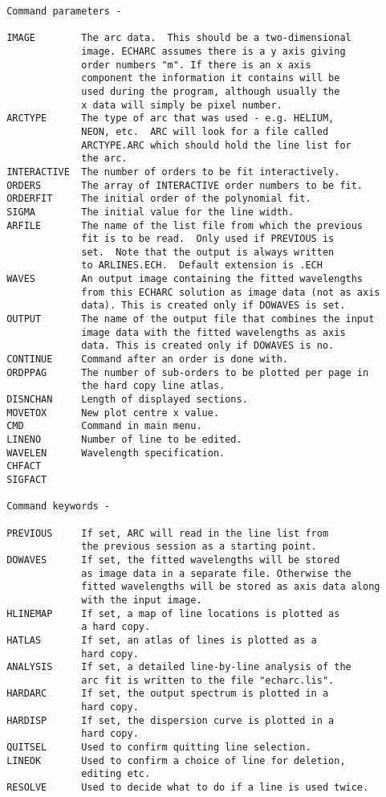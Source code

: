 \begin{description}
\begin{verbatim}
 Command parameters -

 IMAGE        The arc data.  This should be a two-dimensional
              image. ECHARC assumes there is a y axis giving
              order numbers "m". If there is an x axis
              component the information it contains will be
              used during the program, although usually the
              x data will simply be pixel number.
 ARCTYPE      The type of arc that was used - e.g. HELIUM,
              NEON, etc.  ARC will look for a file called
              ARCTYPE.ARC which should hold the line list for
              the arc.
 INTERACTIVE  The number of orders to be fit interactively.
 ORDERS       The array of INTERACTIVE order numbers to be fit.
 ORDERFIT     The initial order of the polynomial fit.
 SIGMA        The initial value for the line width.
 ARFILE       The name of the list file from which the previous
              fit is to be read.  Only used if PREVIOUS is
              set.  Note that the output is always written
              to ARLINES.ECH.  Default extension is .ECH
 WAVES        An output image containing the fitted wavelengths
              from this ECHARC solution as image data (not as axis
              data). This is created only if DOWAVES is set.
 OUTPUT       The name of the output file that combines the input
              image data with the fitted wavelengths as axis
              data. This is created only if DOWAVES is no.
 CONTINUE     Command after an order is done with.
 ORDPPAG      The number of sub-orders to be plotted per page in
              the hard copy line atlas.
 DISNCHAN     Length of displayed sections.
 MOVETOX      New plot centre x value.
 CMD          Command in main menu.
 LINENO       Number of line to be edited.
 WAVELEN      Wavelength specification.
 CHFACT
 SIGFACT

 Command keywords -

 PREVIOUS     If set, ARC will read in the line list from
              the previous session as a starting point.
 DOWAVES      If set, the fitted wavelengths will be stored
              as image data in a separate file. Otherwise the
              fitted wavelengths will be stored as axis data along
              with the input image.
 HLINEMAP     If set, a map of line locations is plotted as
              a hard copy.
 HATLAS       If set, an atlas of lines is plotted as a
              hard copy.
 ANALYSIS     If set, a detailed line-by-line analysis of the
              arc fit is written to the file "echarc.lis".
 HARDARC      If set, the output spectrum is plotted in a
              hard copy.
 HARDISP      If set, the dispersion curve is plotted in a
              hard copy.
 QUITSEL      Used to confirm quitting line selection.
 LINEOK       Used to confirm a choice of line for deletion,
              editing etc.
 RESOLVE      Used to decide what to do if a line is used twice.


\end{verbatim}
\end{description}
